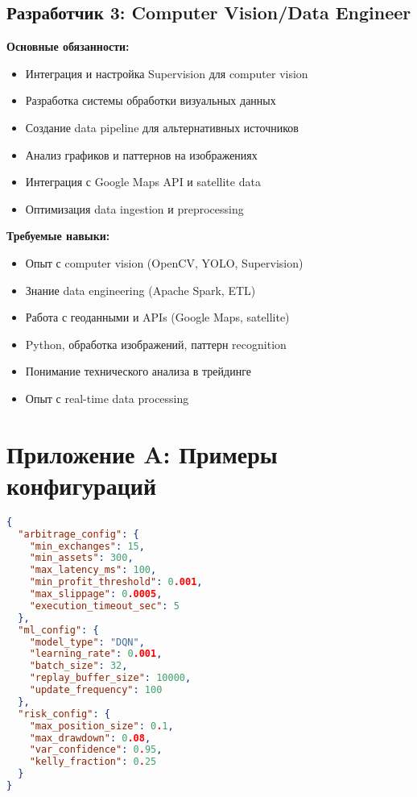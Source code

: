 \documentclass[12pt,a4paper]{article}
\begin{document}
\subsection{Разработчик 3: Computer Vision/Data Engineer}
\textbf{Основные обязанности:}
\begin{itemize}
    \item Интеграция и настройка Supervision для computer vision
    \item Разработка системы обработки визуальных данных
    \item Создание data pipeline для альтернативных источников
    \item Анализ графиков и паттернов на изображениях
    \item Интеграция с Google Maps API и satellite data
    \item Оптимизация data ingestion и preprocessing
\end{itemize}

\textbf{Требуемые навыки:}
\begin{itemize}
    \item Опыт с computer vision (OpenCV, YOLO, Supervision)
    \item Знание data engineering (Apache Spark, ETL)
    \item Работа с геоданными и APIs (Google Maps, satellite)
    \item Python, обработка изображений, паттерн recognition
    \item Понимание технического анализа в трейдинге
    \item Опыт с real-time data processing
\end{itemize}

\appendix
\section{Приложение A: Примеры конфигураций}


\begin{lstlisting}[language=JSON, caption=Configuration Example]
{
  "arbitrage_config": {
    "min_exchanges": 15,
    "min_assets": 300,
    "max_latency_ms": 100,
    "min_profit_threshold": 0.001,
    "max_slippage": 0.0005,
    "execution_timeout_sec": 5
  },
  "ml_config": {
    "model_type": "DQN",
    "learning_rate": 0.001,
    "batch_size": 32,
    "replay_buffer_size": 10000,
    "update_frequency": 100
  },
  "risk_config": {
    "max_position_size": 0.1,
    "max_drawdown": 0.08,
    "var_confidence": 0.95,
    "kelly_fraction": 0.25
  }
}
\end{lstlisting}
\end{document}
